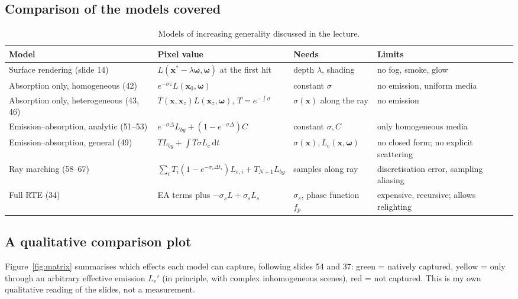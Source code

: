 \documentclass[11pt,a4paper]{article}
\newcommand{\x}{\bm{x}}
\newcommand{\w}{\bm{\omega}}
\theoremstyle{remark}\newtheorem*{remark}{Remark}
\begin{document}
\subsection{Comparison of the models covered}

\begin{table}[h]
\centering
\small
\renewcommand{\arraystretch}{1.35}
\begin{tabular}{@{}p{3.1cm}p{4.4cm}p{3.7cm}p{3.5cm}@{}}
\toprule
\textbf{Model} & \textbf{Pixel value} & \textbf{Needs} & \textbf{Limits}\\
\midrule
Surface rendering (slide 14) & $L(\x^*-\lambda\w,\w)$ at the first hit & depth $\lambda$, shading & no fog, smoke, glow\\
Absorption only, homogeneous (42) & $e^{-\sigma z}L(\x_0,\w)$ & constant $\sigma$ & no emission, uniform media\\
Absorption only, heterogeneous (43, 46) & $T(\x,\x_z)L(\x_z,\w)$, $T=e^{-\int\sigma}$ & $\sigma(\x)$ along the ray & no emission\\
Emission--absorption, analytic (51--53) & $e^{-\sigma\Delta}L_{bg}+(1-e^{-\sigma\Delta})C$ & constant $\sigma,C$ & only homogeneous media\\
Emission--absorption, general (49) & $T L_{bg}+\int T\sigma L_e\,\mathrm dt$ & $\sigma(\x),L_e(\x,\w)$ & no closed form; no explicit scattering\\
Ray marching (58--67) & $\sum_iT_i(1-e^{-\sigma_i\Delta t_i})L_{e,i}+T_{N+1}L_{bg}$ & samples along ray & discretisation error, sampling aliasing\\
Full RTE (34) & EA terms plus $-\sigma_sL+\sigma_sL_s$ & $\sigma_s$, phase function $f_p$ & expensive, recursive; allows relighting\\
\bottomrule
\end{tabular}
\caption{Models of increasing generality discussed in the lecture.}
\end{table}

\subsection{A qualitative comparison plot}

Figure~\ref{fig:matrix} summarises which effects each model can capture, following slides 54 and 37: green = natively captured, yellow = only through an arbitrary effective emission $L_e'$ (in principle, with complex inhomogeneous scenes), red = not captured. This is my own qualitative reading of the slides, not a measurement.
\end{document}
